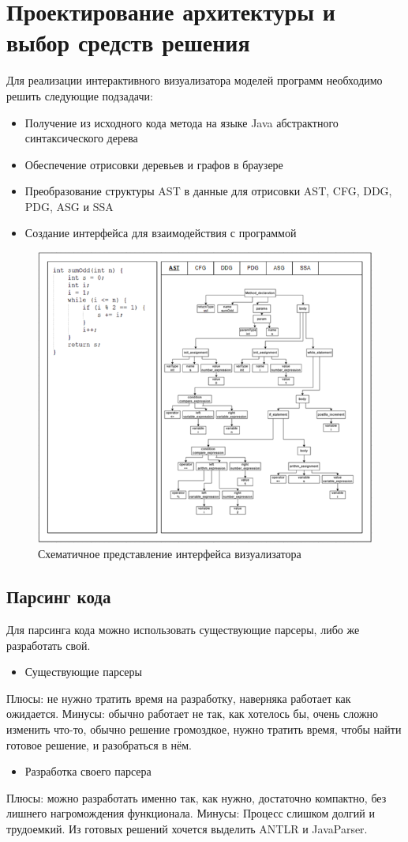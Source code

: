 \chapter{Проектирование архитектуры и выбор средств решения} \label{ch4}
Для реализации интерактивного визуализатора моделей программ необходимо решить следующие подзадачи:
\begin{itemize}
\item Получение из исходного кода метода на языке Java абстрактного синтаксического дерева
\item Обеспечение отрисовки деревьев и графов в браузере
\item Преобразование структуры AST в данные для отрисовки AST, CFG, DDG, PDG, ASG и SSA
\item Создание интерфейса для взаимодействия с программой
\end{itemize}
\begin{figure}[ht!] 
	\center
	\includegraphics [scale=0.27] {my_folder/images/my/12}
	\caption{Схематичное представление интерфейса визуализатора} 
	\label{fig:12}  
\end{figure}
\section{Парсинг кода} \label{ch4:sec1}
Для парсинга кода можно использовать существующие парсеры, либо же разработать свой.
\begin{itemize}
\item Существующие парсеры
\end{itemize}
Плюсы: не нужно тратить время на разработку, наверняка работает как ожидается.
Минусы: обычно работает не так, как хотелось бы, очень сложно изменить что-то, обычно решение громоздкое, нужно тратить время, чтобы найти готовое решение, и разобраться в нём.
\begin{itemize}
\item Разработка своего парсера
\end{itemize}
Плюсы: можно разработать именно так, как нужно, достаточно компактно, без лишнего нагромождения функционала.
Минусы: Процесс слишком долгий и трудоемкий.
Из готовых решений хочется выделить ANTLR и JavaParser.
